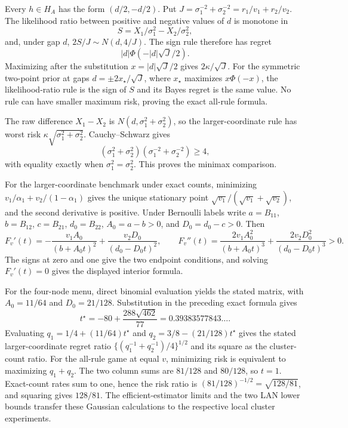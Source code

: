 Every \(h\in H_A\) has the form \((d/2,-d/2)\).  Put \(J=\sigma_1^{-2}+\sigma_2^{-2}=r_1/v_1+r_2/v_2\).  The likelihood ratio between positive and negative values of \(d\) is monotone in
\[
 S=X_1/\sigma_1^2-X_2/\sigma_2^2,
\]
and, under gap \(d\), \(2S/J\sim N(d,4/J)\).  The sign rule therefore has regret
\[
 |d|\Phi(-|d|\sqrt J/2).
\]
Maximizing after the substitution \(x=|d|\sqrt J/2\) gives \(2\kappa/\sqrt J\).  For the symmetric two-point prior at gaps \(d=\pm2x_\star/\sqrt J\), where \(x_\star\) maximizes \(x\Phi(-x)\), the likelihood-ratio rule is the sign of \(S\) and its Bayes regret is the same value.  No rule can have smaller maximum risk, proving the exact all-rule formula.

The raw difference \(X_1-X_2\) is \(N(d,\sigma_1^2+\sigma_2^2)\), so the larger-coordinate rule has worst risk \(\kappa\sqrt{\sigma_1^2+\sigma_2^2}\).  Cauchy--Schwarz gives
\[
 (\sigma_1^2+\sigma_2^2)(\sigma_1^{-2}+\sigma_2^{-2})\geq4,
\]
with equality exactly when \(\sigma_1^2=\sigma_2^2\).  This proves the minimax comparison.

For the larger-coordinate benchmark under exact counts, minimizing \(v_1/\alpha_1+v_2/(1-\alpha_1)\) gives the unique stationary point \(\sqrt{v_1}/(\sqrt{v_1}+\sqrt{v_2})\), and the second derivative is positive.  Under Bernoulli labels write \(a=B_{11}\), \(b=B_{12}\), \(c=B_{21}\), \(d_0=B_{22}\), \(A_0=a-b>0\), and \(D_0=d_0-c>0\).  Then
\[
 F_v'(t)=-\frac{v_1A_0}{(b+A_0t)^2}+\frac{v_2D_0}{(d_0-D_0t)^2},
 \qquad
 F_v''(t)=\frac{2v_1A_0^2}{(b+A_0t)^3}+\frac{2v_2D_0^2}{(d_0-D_0t)^3}>0.
\]
The signs at zero and one give the two endpoint conditions, and solving \(F_v'(t)=0\) gives the displayed interior formula.

For the four-node menu, direct binomial evaluation yields the stated matrix, with \(A_0=11/64\) and \(D_0=21/128\).  Substitution in the preceding exact formula gives
\[
 t^\star=-80+\frac{288\sqrt{462}}{77}=0.39383577843\ldots .
\]
Evaluating \(q_1=1/4+(11/64)t^\star\) and \(q_2=3/8-(21/128)t^\star\) gives the stated larger-coordinate regret ratio \(\{(q_1^{-1}+q_2^{-1})/4\}^{1/2}\) and its square as the cluster-count ratio.  For the all-rule game at equal \(v\), minimizing risk is equivalent to maximizing \(q_1+q_2\).  The two column sums are \(81/128\) and \(80/128\), so \(t=1\).  Exact-count rates sum to one, hence the risk ratio is \((81/128)^{-1/2}=\sqrt{128/81}\), and squaring gives \(128/81\).  The efficient-estimator limits and the two LAN lower bounds transfer these Gaussian calculations to the respective local cluster experiments.